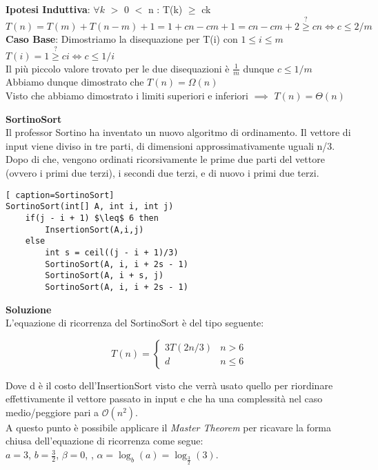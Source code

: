 \documentclass[../cheatSheetAlgoritmi.tex]{subfiles}
\begin{document}
\bigskip
\textbf{Ipotesi Induttiva}: $\forall k$ $>$ 0 $<$ n : T(k) $\geq$ ck\\
$T(n) = T(m) + T(n-m) + 1 = 1 + cn - cm + 1 = cn - cm + 2 \stackrel{?}{\geq} cn \iff c \leq 2/m$\\
\textbf{Caso Base}: Dimostriamo la disequazione per T(i) con $1 \leq i \leq m$\\
$T(i) = 1 \stackrel{?}{\geq} ci \iff c \leq 1/i$\\
Il più piccolo valore trovato per le due disequazioni è $\frac{1}{m}$ dunque $c \leq 1/m$\\
Abbiamo dunque dimostrato che $T(n) = \Omega(n)$\\
Visto che abbiamo dimostrato i limiti superiori e inferiori $\implies$ $T(n) = \Theta(n)$


\textbf{SortinoSort}\\
Il professor Sortino ha inventato un nuovo algoritmo di ordinamento. Il vettore di input viene diviso in tre parti, di dimensioni approssimativamente uguali n/3. Dopo di che, vengono ordinati ricorsivamente le prime due parti del vettore (ovvero i primi due terzi), i secondi due terzi, e di nuovo i primi due terzi.
\begin{lstlisting}[ caption=SortinoSort]
SortinoSort(int[] A, int i, int j)
	if(j - i + 1) $\leq$ 6 then
		InsertionSort(A,i,j)
	else
		int s = ceil((j - i + 1)/3)
		SortinoSort(A, i, i + 2s - 1)
		SortinoSort(A, i + s, j)
		SortinoSort(A, i, i + 2s - 1)
\end{lstlisting}
\textbf{Soluzione}\\
L'equazione di ricorrenza del SortinoSort è del tipo seguente:
\begin{center}
	\begin{equation*}
  		T(n)=\begin{cases}
			3T(2n/3) & \text{$n > 6$}\\
			d & \text{$n \leq 6$}	
  		\end{cases}
	\end{equation*}
\end{center}
Dove d è il costo dell'InsertionSort visto che verrà usato quello per riordinare effettivamente il vettore passato in input e che ha una complessità nel caso medio/peggiore pari a $\mathcal{O}(n^{2})$.\\
A questo punto è possibile applicare il \textit{Master Theorem} per ricavare la forma chiusa dell'equazione di ricorrenza come segue: \\
$a = 3$, $b = \frac{3}{2}$, $\beta = 0$, , $\alpha = \log_b(a) = \log_\frac{3}{2}(3)$. \\
\end{document}
